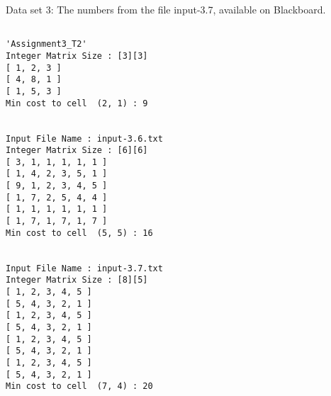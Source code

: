 \documentclass[11pt]{article}
\begin{document}
Data set 3:  The  numbers from the file input-3.7, available on Blackboard. 

\pagebreak



\begin{verbatim}
    
'Assignment3_T2' 
Integer Matrix Size : [3][3]
[ 1, 2, 3 ]
[ 4, 8, 1 ]
[ 1, 5, 3 ]
Min cost to cell  (2, 1) : 9


Input File Name : input-3.6.txt
Integer Matrix Size : [6][6]
[ 3, 1, 1, 1, 1, 1 ]
[ 1, 4, 2, 3, 5, 1 ]
[ 9, 1, 2, 3, 4, 5 ]
[ 1, 7, 2, 5, 4, 4 ]
[ 1, 1, 1, 1, 1, 1 ]
[ 1, 7, 1, 7, 1, 7 ]
Min cost to cell  (5, 5) : 16


Input File Name : input-3.7.txt
Integer Matrix Size : [8][5]
[ 1, 2, 3, 4, 5 ]
[ 5, 4, 3, 2, 1 ]
[ 1, 2, 3, 4, 5 ]
[ 5, 4, 3, 2, 1 ]
[ 1, 2, 3, 4, 5 ]
[ 5, 4, 3, 2, 1 ]
[ 1, 2, 3, 4, 5 ]
[ 5, 4, 3, 2, 1 ]
Min cost to cell  (7, 4) : 20
\end{verbatim}
\end{document}
